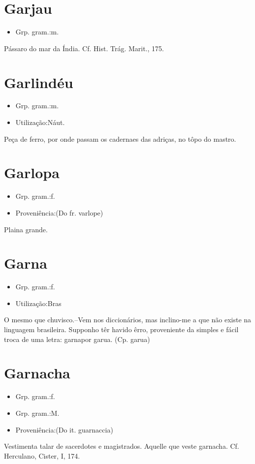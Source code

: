 \section{Garjau}
\begin{itemize}
\item {Grp. gram.:m.}
\end{itemize}
Pássaro do mar da Índia. Cf. \textunderscore Hist. Trág. Marit.\textunderscore , 175.
\section{Garlindéu}
\begin{itemize}
\item {Grp. gram.:m.}
\end{itemize}
\begin{itemize}
\item {Utilização:Náut.}
\end{itemize}
Peça de ferro, por onde passam os cadernaes das adriças, no tôpo do mastro.
\section{Garlopa}
\begin{itemize}
\item {Grp. gram.:f.}
\end{itemize}
\begin{itemize}
\item {Proveniência:(Do fr. \textunderscore varlope\textunderscore )}
\end{itemize}
Plaina grande.
\section{Garna}
\begin{itemize}
\item {Grp. gram.:f.}
\end{itemize}
\begin{itemize}
\item {Utilização:Bras}
\end{itemize}
O mesmo que \textunderscore chuvisco\textunderscore .--Vem nos diccionários, mas inclino-me a que não existe na linguagem brasileira. Supponho têr havido êrro, proveniente da simples e fácil troca de uma letra: \textunderscore garna\textunderscore  por \textunderscore garua\textunderscore .
(Cp. \textunderscore garua\textunderscore )
\section{Garnacha}
\begin{itemize}
\item {Grp. gram.:f.}
\end{itemize}
\begin{itemize}
\item {Grp. gram.:M.}
\end{itemize}
\begin{itemize}
\item {Proveniência:(Do it. \textunderscore guarnaccia\textunderscore )}
\end{itemize}
Vestimenta talar de sacerdotes e magistrados.
Aquelle que veste garnacha. Cf. Herculano, \textunderscore Cister\textunderscore , I, 174.
